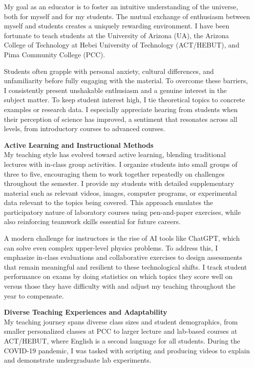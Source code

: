 \documentclass[11pt]{article}
\begin{document}
My goal as an educator is to foster an intuitive understanding of the universe, both for myself and for my students. The mutual exchange of enthusiasm between myself and students creates a uniquely rewarding environment. I have been fortunate to teach students at the University of Arizona (UA), the Arizona College of Technology at Hebei University of Technology (ACT/HEBUT), and Pima Community College (PCC).

Students often grapple with personal anxiety, cultural differences, and unfamiliarity before fully engaging with the material. To overcome these barriers, I consistently present unshakable enthusiasm and a genuine interest in the subject matter. To keep student interest high, I tie theoretical topics to concrete examples or research data. I especially appreciate hearing from students when their perception of science has improved, a sentiment that resonates across all levels, from introductory courses to advanced courses.

{\large\textbf{Active Learning and Instructional Methods}}\\
My teaching style has evolved toward active learning, blending traditional lectures with in-class group activities. I organize students into small groups of three to five, encouraging them to work together repeatedly on challenges throughout the semester. I provide my students with detailed supplementary material such as relevant videos, images, computer programs, or experimental data relevant to the topics being covered. This approach emulates the participatory nature of laboratory courses using pen-and-paper exercises, while also reinforcing teamwork skills essential for future careers. 

A modern challenge for instructors is the rise of AI tools like ChatGPT, which can solve even complex upper-level physics problems. To address this, I emphasize in-class evaluations and collaborative exercises to design assessments that remain meaningful and resilient to these technological shifts. I track student performance on exams by doing statistics on which topics they score well on versus those they have difficulty with and adjust my teaching throughout the year to compensate.

{\large\textbf{Diverse Teaching Experiences and Adaptability}}\\
My teaching journey spans diverse class sizes and student demographics, from smaller personalized classes at PCC to larger lecture and lab-based courses at ACT/HEBUT, where English is a second language for all students. During the COVID-19 pandemic, I was tasked with scripting and producing videos to explain and demonstrate undergraduate lab experiments. 
\end{document}
